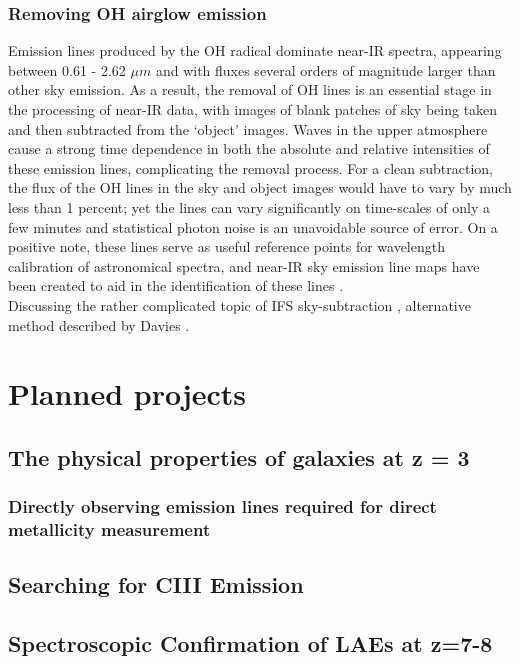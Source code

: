 \documentclass{literature}
\begin{document}
\subsubsection{Removing OH airglow emission}
Emission lines produced by the OH radical dominate near-IR spectra, appearing between 0.61 - 2.62 $\mu m$ and with fluxes several orders of magnitude larger than other sky emission. As a result, the removal of OH lines is an essential stage in the processing of near-IR data, with images of blank patches of sky being taken and then subtracted from the `object' images. Waves in the upper atmosphere cause a strong time dependence in both the absolute and relative intensities of these emission lines, complicating the removal process. For a clean subtraction, the flux of the OH lines in the sky and object images would have to vary by much less than 1 percent; yet the lines can vary significantly on time-scales of only a few minutes and statistical photon noise is an unavoidable source of error. On a positive note, these lines serve as useful reference points for wavelength calibration of astronomical spectra, and near-IR sky emission line maps have been created to aid in the identification of these lines \citep{Rousselot2000}. \\ 
Discussing the rather complicated topic of IFS sky-subtraction \citep{AllingtonSmith1998a}, alternative method described by Davies \citep{Davies2007}.

 




\section{Planned projects}\label{sec:projects}
\subsection{The physical properties of galaxies at z = 3}
\subsubsection{Directly observing emission lines required for direct metallicity measurement}




\subsection{Searching for CIII Emission}




\subsection{Spectroscopic Confirmation of LAEs at z=7-8}


\clearpage 

%

\end{document}
